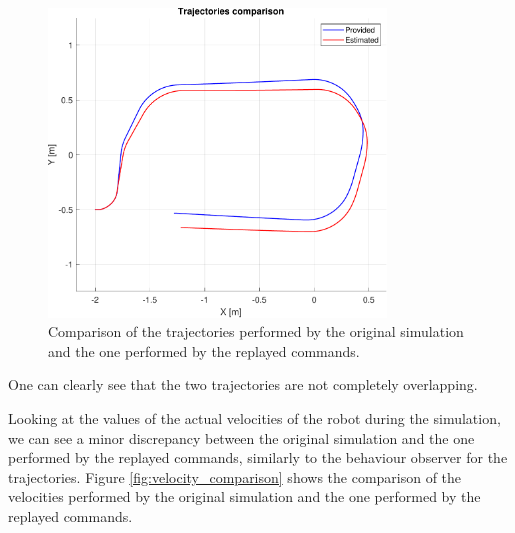 \begin{figure}[H]
    \centering
    \includegraphics[width=0.8\textwidth]{./img/MATLAB/trajectories_comparison.pdf}
    \caption{Comparison of the trajectories performed by the original simulation and the one performed by the replayed commands.}
    \label{fig:trajectory_comparison}
\end{figure}

One can clearly see that the two trajectories are not completely overlapping.

Looking at the values of the actual velocities of the robot during the simulation, we can see a minor discrepancy between the original simulation and the one performed by the replayed commands, similarly to the behaviour observer for the trajectories.
Figure \ref{fig:velocity_comparison} shows the comparison of the velocities performed by the original simulation and the one performed by the replayed commands.

